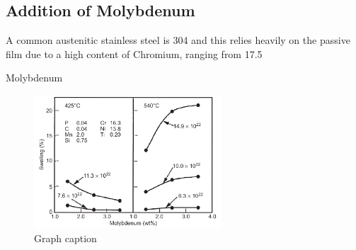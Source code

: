 \subsection{Addition of Molybdenum}

A common austenitic stainless steel is 304 and this relies heavily on the passive film due to a high content of Chromium, ranging from 17.5%

Molybdenum 



\begin{figure}[tbp]
  \begin{center}
    \includegraphics[width=7.0cm]{chapters/background_austenitic_steels_in_nuclear/plots/moswelling.png}
    \caption{Graph caption}
    \label{image:flux1}
  \end{center}
\end{figure}